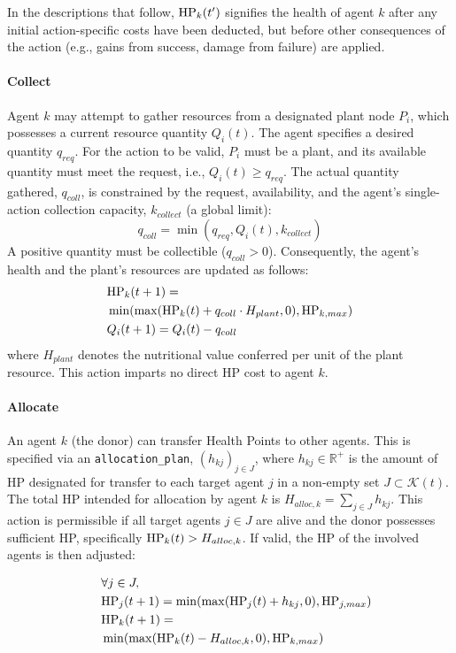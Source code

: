 In the descriptions that follow, $\mathrm{HP}_k(t')$ signifies the health of agent $k$ after any initial action-specific costs have been deducted, but before other consequences of the action (e.g., gains from success, damage from failure) are applied.

\paragraph{Collect}
Agent $k$ may attempt to gather resources from a designated plant node $P_i$, which possesses a current resource quantity $Q_i(t)$. The agent specifies a desired quantity $q_{req}$. For the action to be valid, $P_i$ must be a plant, and its available quantity must meet the request, i.e., $Q_i(t) \ge q_{req}$. The actual quantity gathered, $q_{coll}$, is constrained by the request, availability, and the agent's single-action collection capacity, $k_{collect}$ (a global limit):
$$ q_{coll} = \min(q_{req}, Q_i(t), k_{collect}) $$
A positive quantity must be collectible ($q_{coll} > 0$). Consequently, the agent's health and the plant's resources are updated as follows:
\begin{align*}
    &\mathrm{HP}_k(t+1) = \\
    &\min(\max(\mathrm{HP}_k(t) + q_{coll} \cdot H_{plant}, 0), \mathrm{HP}_{k,max}) \\
    & Q_i(t+1) = Q_i(t) - q_{coll}
\end{align*}
where $H_{plant}$ denotes the nutritional value conferred per unit of the plant resource. This action imparts no direct HP cost to agent $k$.

\paragraph{Allocate}
An agent $k$ (the donor) can transfer Health Points to other agents. This is specified via an \texttt{allocation\_plan}, $(h_{kj})_{j \in J}$, where $h_{kj} \in \mathbb{R}^+$ is the amount of HP designated for transfer to each target agent $j$ in a non-empty set $J \subset \mathcal{K}(t)$. The total HP intended for allocation by agent $k$ is $H_{alloc,k} = \sum_{j \in J} h_{kj}$. This action is permissible if all target agents $j \in J$ are alive and the donor possesses sufficient HP, specifically $\mathrm{HP}_k(t) > H_{alloc,k}$. If valid, the HP of the involved agents is then adjusted:

{\small\begin{align*}
    &\forall j \in J,\\ \quad &\mathrm{HP}_j(t+1) = \min(\max(\mathrm{HP}_j(t) + h_{kj}, 0), \mathrm{HP}_{j,max}) \\
    &\mathrm{HP}_k(t+1) = \\
    &\min(\max(\mathrm{HP}_k(t) - H_{alloc,k}, 0), \mathrm{HP}_{k,max})
\end{align*}}

